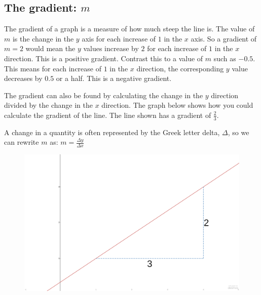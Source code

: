 \documentclass[
  a4paper,
]{scrbook}
\begin{document}
\hypertarget{the-gradient-m}{%
\subsection{\texorpdfstring{The gradient:
\(m\)}{The gradient: m}}\label{the-gradient-m}}

The gradient of a graph is a measure of how much steep the line is. The
value of \(m\) is the change in the \(y\) axis for each increase of
\(1\) in the \(x\) axis. So a gradient of \(m=2\) would mean the \(y\)
values increase by \(2\) for each increase of \(1\) in the \(x\)
direction. This is a positive gradient. Contrast this to a value of
\(m\) such as \(-0.5\). This means for each increase of \(1\) in the
\(x\) direction, the corresponding \(y\) value decreases by \(0.5\) or a
half. This is a negative gradient.

The gradient can also be found by calculating the change in the \(y\)
direction divided by the change in the \(x\) direction. The graph below
shows how you could calculate the gradient of the line. The line shown
has a gradient of \(\frac{2}{3}\).

\begin{tcolorbox}[enhanced jigsaw, opacityback=0, left=2mm, toptitle=1mm, title=\textcolor{quarto-callout-tip-color}{\faLightbulb}\hspace{0.5em}{Pro tip}, breakable, colbacktitle=quarto-callout-tip-color!10!white, opacitybacktitle=0.6, bottomtitle=1mm, arc=.35mm, colback=white, leftrule=.75mm, bottomrule=.15mm, colframe=quarto-callout-tip-color-frame, rightrule=.15mm, titlerule=0mm, toprule=.15mm, coltitle=black]
A change in a quantity is often represented by the Greek letter delta,
\(\Delta\), so we can rewrite \(m\) as:
\(m = \frac{\Delta y}{\Delta x}\)
\end{tcolorbox}

\begin{figure}

{\centering 

\href{https://www.desmos.com/calculator/a3c9vcaede?embed}{\includegraphics{./06-straight_line_graphs_files/figure-pdf/unnamed-chunk-5-1.png}}

}

\end{figure}
\end{document}
